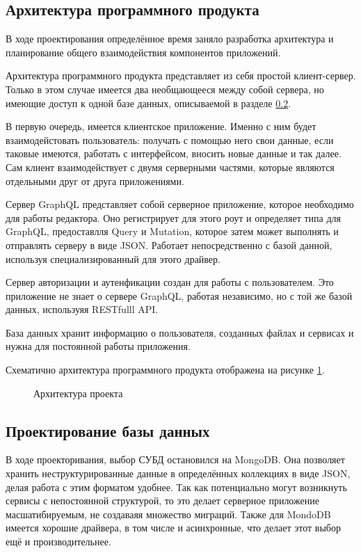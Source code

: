 \subsection{Архитектура программного продукта}

В ходе проектирования определённое время заняло разработка архитектура и планирование общего взаимодействия компонентов приложений.

Архитектура программного продукта представляет из себя простой клиент-сервер. Только в этом случае имеется два необщающееся между собой сервера, но имеющие
доступ к одной базе данных, описываемой в разделе \ref{des:bd_section}.

В первую очередь, имеется клиентское приложение. Именно с ним будет взаимодейстовать пользователь: получать с помощью него свои данные, если таковые имеются,
работать с интерфейсом, вносить новые данные и так далее. Сам клиент взаимодействует с двумя серверными частями, которые являются отдельными друг от друга приложениями.

Сервер GraphQL представляет собой серверное приложение, которое необходимо для работы редактора. Оно регистрирует для этого роут и определяет типа для GraphQL, предоставлля
Query и Mutation, которое затем может выполнять и отправлять серверу в виде JSON. Работает непосредственно с базой данной, используя специализированный для этого драйвер.

Сервер авторизации и аутенфикации создан для работы с пользователем. Это приложение не знает о сервере GraphQL, работая независимо, но с той же базой данных, используяя
RESTfulll API.

База данных хранит информацию о пользователя, созданных файлах и сервисах и нужна для постоянной работы приложения.

Схематично архитектура программного продукта отображена на рисунке \ref{des:arch}.

\begin{figure}[H]
    \caption{Архитектура проекта}
    \label{des:arch}
\end{figure}

\subsection{Проектирование базы данных}

\label{des:bd_section}

В ходе проекторивания, выбор СУБД остановился на MongoDB. Она позволяет хранить неструктурированные данные в определённых коллекциях в виде JSON, делая работа с этим форматом удобнее.
Так как потенциально могут возникнуть сервисы с непостоянной структурой, то это делает серверное приложение масшатибируемым, не создаваяя множество миграций. Также для MondoDB имеется
хорошие драйвера, в том числе и асинхронные, что делает этот выбор ещё и производительнее.

